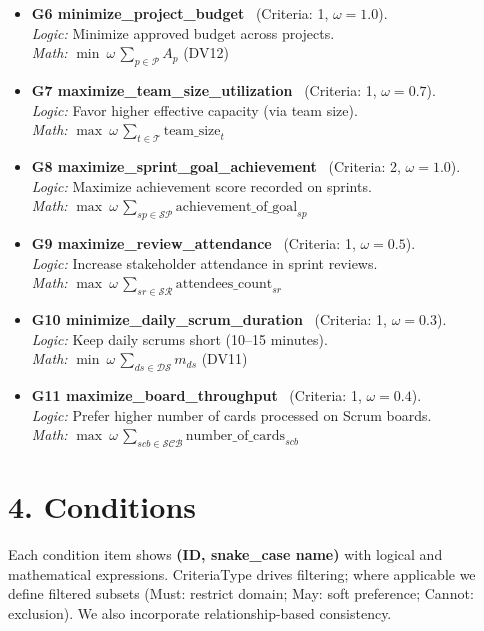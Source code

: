 \documentclass[11pt,a4paper]{article}
\begin{document}
\begin{itemize}[leftmargin=2em]
  \item \textbf{G6 minimize\_project\_budget} \ (Criteria: 1, \(\omega=1.0\)). \\
  \emph{Logic:} Minimize approved budget across projects. \\
  \emph{Math:} \(\displaystyle \min \ \omega\,\sum_{p\in\mathcal{P}} A_p\) \quad (DV12)

  \item \textbf{G7 maximize\_team\_size\_utilization} \ (Criteria: 1, \(\omega=0.7\)). \\
  \emph{Logic:} Favor higher effective capacity (via team size). \\
  \emph{Math:} \(\displaystyle \max \ \omega\,\sum_{t\in\mathcal{T}} \text{team\_size}_{t}\)

  \item \textbf{G8 maximize\_sprint\_goal\_achievement} \ (Criteria: 2, \(\omega=1.0\)). \\
  \emph{Logic:} Maximize achievement score recorded on sprints. \\
  \emph{Math:} \(\displaystyle \max \ \omega\,\sum_{sp\in\mathcal{SP}} \text{achievement\_of\_goal}_{sp}\)

  \item \textbf{G9 maximize\_review\_attendance} \ (Criteria: 1, \(\omega=0.5\)). \\
  \emph{Logic:} Increase stakeholder attendance in sprint reviews. \\
  \emph{Math:} \(\displaystyle \max \ \omega\,\sum_{sr\in\mathcal{SR}} \text{attendees\_count}_{sr}\)

  \item \textbf{G10 minimize\_daily\_scrum\_duration} \ (Criteria: 1, \(\omega=0.3\)). \\
  \emph{Logic:} Keep daily scrums short (10--15 minutes). \\
  \emph{Math:} \(\displaystyle \min \ \omega\,\sum_{ds\in\mathcal{DS}} m_{ds}\) \quad (DV11)

  \item \textbf{G11 maximize\_board\_throughput} \ (Criteria: 1, \(\omega=0.4\)). \\
  \emph{Logic:} Prefer higher number of cards processed on Scrum boards. \\
  \emph{Math:} \(\displaystyle \max \ \omega\,\sum_{scb\in\mathcal{SCB}} \text{number\_of\_cards}_{scb}\)
\end{itemize}

\section{4. Conditions}
Each condition item shows \textbf{(ID, snake\_case name)} with logical and mathematical expressions. CriteriaType drives filtering; where applicable we define filtered subsets (Must: restrict domain; May: soft preference; Cannot: exclusion). We also incorporate relationship-based consistency.
\end{document}
